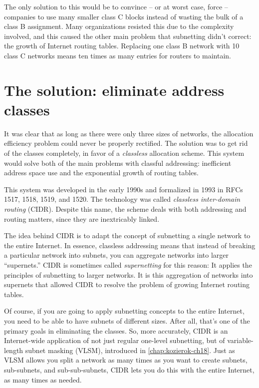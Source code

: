 The only solution to this would be to convince -- or at worst case,
force -- companies to use many smaller class C blocks instead of wasting
the bulk of a class B assignment. Many organizations resisted this due
to the complexity involved, and this caused the other main problem that
subnetting didn't correct: the growth of Internet routing tables.
Replacing one class B network with 10 class C networks means ten times
as many entries for routers to maintain.

\section{The solution: eliminate address classes}

It was clear that as long as there were only three sizes of networks,
the allocation efficiency problem could never be properly rectified. The
solution was to get rid of the classes completely, in favor of a
{\emph{classless}}
allocation scheme. This system would solve both of the main problems
with classful addressing: inefficient address space use and the
exponential growth of routing tables.

This system was developed in the early 1990s and formalized in 1993 in
RFCs 1517, 1518, 1519, and 1520.
The technology was called \emph{classless inter-domain routing} (CIDR).
Despite this name, the scheme deals with both addressing and routing matters, since they are inextricably linked.

The idea behind CIDR is to adapt the concept of subnetting a single
network to the entire Internet. In essence, classless addressing means
that instead of breaking a particular network into subnets, you can
aggregate networks into larger ``supernets.''
CIDR is sometimes called {\emph{supernetting}} for this reason: It applies the principles of
subnetting to larger networks. It is this aggregation of networks into
supernets that allowed CIDR to resolve the problem of growing Internet
routing tables.

Of course, if you are going to apply subnetting concepts to the entire
Internet, you need to be able to have subnets of different sizes. After
all, that's one of the primary goals in eliminating the classes. So,
more accurately, CIDR is an Internet-wide application of not just
regular one-level subnetting, but of variable-length subnet masking (VLSM), introduced in \cref{chap:kozierok-ch18}.
Just as VLSM allows you split a network as many times as you want to create subnets, sub-subnets, and sub-sub-subnets,
CIDR lets you do this with the entire Internet, as many times as needed.


